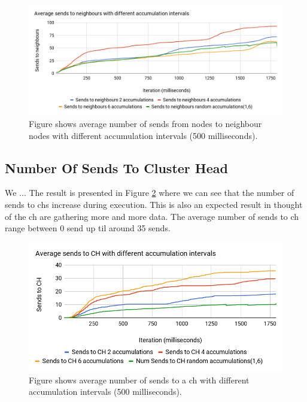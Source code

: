 \documentclass[USenglish]{uit-thesis}
\begin{document}
\begin{figure} [ht]
\centering
\includegraphics[width=\textwidth]{sendsChart.png}
\caption{Figure shows average number of sends from nodes to neighbour nodes with different accumulation intervals (500 milliseconds).}
\label{fig:sendsChart}
\end{figure}


\subsection{Number Of Sends To Cluster Head}
We ... The result is presented in Figure \ref{fig:sendschChart} where we can see that the number of sends to \gls{ch}s increase during execution. This is also an expected result in thought of the \gls{ch} are gathering more and more data. The average number of sends to \gls{ch} range between 0 send up til around 35 sends.


\begin{figure} [ht]
\centering
\includegraphics[width=\textwidth]{sendschChart.png}
\caption{Figure shows average number of sends to a \gls{ch} with different accumulation intervals (500 milliseconds).}
\label{fig:sendschChart}
\end{figure}
\end{document}
